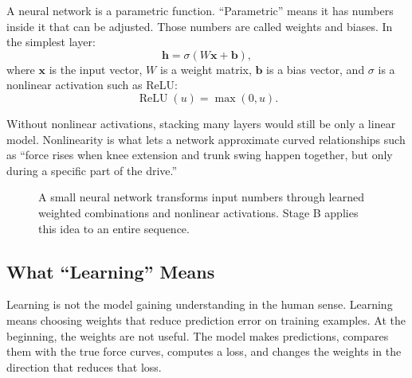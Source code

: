 \documentclass[11pt]{article}
\newcommand{\vect}[1]{\boldsymbol{#1}}
\begin{document}
A neural network is a parametric function. ``Parametric'' means it has numbers
inside it that can be adjusted. Those numbers are called weights and biases.
In the simplest layer:
\[
  \vect{h}
  =
  \sigma(W\vect{x}+\vect{b}),
\]
where \(\vect{x}\) is the input vector, \(W\) is a weight matrix,
\(\vect{b}\) is a bias vector, and \(\sigma\) is a nonlinear activation such as
ReLU:
\[
  \operatorname{ReLU}(u)=\max(0,u).
\]

Without nonlinear activations, stacking many layers would still be only a
linear model. Nonlinearity is what lets a network approximate curved
relationships such as ``force rises when knee extension and trunk swing happen
together, but only during a specific part of the drive.''

\begin{figure}[H]
  \centering
  \caption{A small neural network transforms input numbers through learned
  weighted combinations and nonlinear activations. Stage B applies this idea to
  an entire sequence.}
  \label{fig:small-neural-network}
\end{figure}

\subsection{What ``Learning'' Means}

Learning is not the model gaining understanding in the human sense. Learning
means choosing weights that reduce prediction error on training examples.
At the beginning, the weights are not useful. The model makes predictions,
compares them with the true force curves, computes a loss, and changes the
weights in the direction that reduces that loss.
\end{document}
